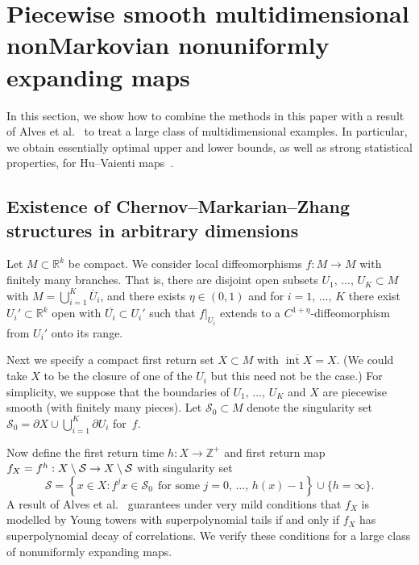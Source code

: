 \documentclass[AHL,Unicode,longabstracts,published]{cedram}
\newcommand{\R}{\mathbb{R}}
\newcommand{\Z}{\mathbb{Z}}
\newcommand{\cS}{\mathcal{S}}
\DeclareMathOperator{\Int}{int}
\begin{document}
\section{Piecewise smooth multidimensional nonMarkovian nonuniformly expanding maps}\label{sec:NUE}

In this section, we show how to combine the methods in this paper with a result of Alves et al.~\cite{AFLV11} to treat a large class of multidimensional examples. In particular, we obtain essentially optimal upper and lower bounds, as well as strong statistical properties, for Hu--Vaienti maps~\cite{HuVaienti09}.

\subsection{Existence of Chernov--Markarian--Zhang structures in arbitrary dimensions}\label{sec:piecewise}

Let $M\subset\R^k$ be compact. We consider local diffeomorphisms $f:M\to M$ with finitely many branches. That is, there are disjoint open subsets $U_1,\,\dots,\,U_K\subset M$ with $M=\bigcup_{i=1}^K \overline{U}_i$, and there exists $\eta\in(0,1)$ and for $i=1,\,\dots,\,K$ there exist $U_i'\subset \R^k$ open with $\overline{U_i}\subset U_i'$ such that $f|_{U_i}$ extends to a $C^{1+\eta}$-diffeomorphism from $U_i'$ onto its range.

Next we specify a compact first return set $X\subset M$ with $\overline{\Int X}=X$. (We could take $X$ to be the closure of one of the $U_i$ but this need not be the case.) For simplicity, we suppose that the boundaries of $U_1,\,\dots,\,U_K$ and $X$ are piecewise smooth (with finitely many pieces). Let $\cS_0\subset M$ denote the singularity set $\cS_0=\partial X\cup\bigcup_{i=1}^K\partial U_i$ for~$f$.

Now define the first return time $h:X\to\Z^+$ and first return map $f_X\linebreak=f^h:X\setminus\cS\to X\setminus\cS$ with singularity set
\[
\cS=\left\{x\in X:f^jx\in\cS_0\;\,\text{for some }j=0,\,\dots,\,h(x)-1\right\}\cup \{h=\infty\}.
\]
A result of Alves et al.~\cite{AFLV11} guarantees under very mild conditions that $f_X$ is modelled by Young towers with superpolynomial tails if and only if $f_X$ has superpolynomial decay of correlations. We verify these conditions for a large class of nonuniformly expanding maps.
\end{document}
